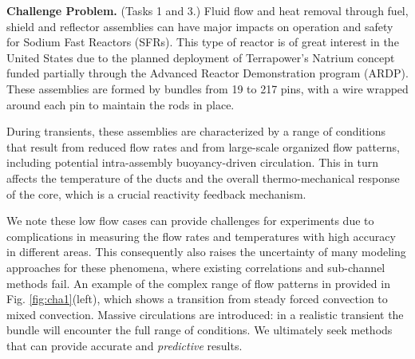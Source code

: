 \noindent \textbf{Challenge Problem.} (Tasks 1 and 3.)
Fluid flow and heat removal through fuel, shield and reflector assemblies  can
have major impacts on operation and safety for Sodium Fast Reactors (SFRs).
This type of reactor is of great interest in the United States due to the
planned  deployment of Terrapower's Natrium concept funded partially through
the Advanced Reactor Demonstration program (ARDP). These assemblies are formed
by bundles from 19 to 217 pins, with a wire wrapped around each pin to maintain
the rods in place.

During transients, these assemblies are characterized by a range of conditions
that result from reduced flow rates and from large-scale organized flow
patterns, including potential intra-assembly buoyancy-driven circulation. This
in turn affects the temperature of the ducts and the overall thermo-mechanical
response of the core, which is a crucial reactivity feedback mechanism.

We note these low flow cases can provide challenges for experiments due to
complications in measuring the flow rates and temperatures with high accuracy
in different areas. This consequently also raises the uncertainty of many
modeling approaches for these phenomena, where existing correlations and
sub-channel methods fail. An example of the complex range of flow patterns in
provided in Fig. \ref{fig:cha1}(left), which shows a transition from steady forced
convection to mixed convection.  Massive circulations are introduced: in a
realistic transient the bundle will encounter the full range of conditions. We
ultimately seek methods that can provide accurate and \textit{predictive}
results.
